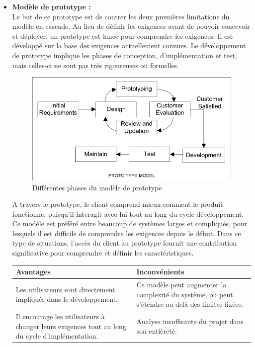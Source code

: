 \documentclass[a4paper, 12pt]{report}
\begin{document}
\begin{itemize}
 \item  \textbf{Modèle de prototype :}\\
Le but de ce prototype est de contrer les deux premières limitations du modèle en cascade. Au lieu de définir les exigences avant de pouvoir concevoir et déployer, un prototype est lancé pour comprendre les exigences. Il est développé sur la base des exigences actuellement connues. Le développement de prototype implique les phases de conception, d'implémentation et test, mais celles-ci ne sont pas très rigoureuses ou formelles. \\
\begin{figure}[H]
\centering
\includegraphics[width = 1\linewidth]{img/prototype-model.png}
\caption{Différentes phases du modèle de prototype }
\end{figure}
A travers le prototype, le client comprend mieux comment le produit fonctionne, puisqu'il interagit avec lui tout au long du cycle développement. \\
Ce modèle est préféré entre beaucoup de systèmes larges et compliqués, pour lesquels il est difficile de comprendre les exigences depuis le début. Dans ce type de situations, l’accès du client au prototype fournit une contribution significative pour comprendre et définir les caractéristiques.
\begin{table}[H]
\begin{tabular}{|p{6cm}|p{6cm}|} 
\hline  
\centering \textbf{Avantages} & \raggedright  \textbf{Inconvénients} \tabularnewline  
\hline
\raggedright Les utilisateurs sont directement impliqués dans le développement.  &  Ce modèle peut augmenter la complexité du système, ou peut s'étendre au-delà des limites fixées.    \tabularnewline  
\hline  
\raggedright Il encourage les utilisateurs à changer leurs exigences tout au long du cycle d'implémentation. & Analyse insuffisante du projet dans son entièreté.   \tabularnewline

\end{tabular}
\end{table}
\end{itemize}
\end{document}
